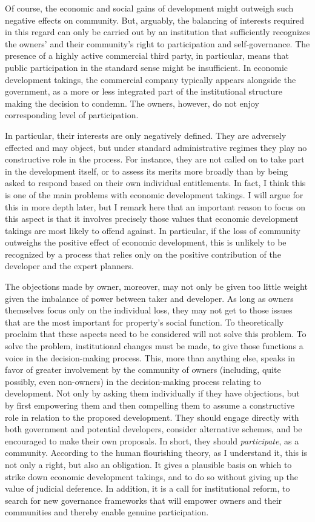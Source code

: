 Of course, the economic and social gains of development might outweigh such negative effects on community. But, arguably, the balancing of interests required in this regard can only be carried out by an institution that sufficiently recognizes the owners' and their community's right to participation and self-governance. The presence of a highly active commercial third party, in particular, means that public participation in the standard sense might be insufficient. In economic development takings, the commercial company typically appears alongside the government, as a more or less integrated part of the institutional structure making the decision to condemn. The owners, however, do not enjoy corresponding level of participation.

In particular, their interests are only negatively defined. They are adversely effected and may object, but under standard administrative regimes they play no constructive role in the process. For instance, they are not called on to take part in the development itself, or to assess its merits more broadly than by being asked to respond based on their own individual entitlements. In fact, I think this is one of the main problems with economic development takings. I will argue for this in more depth later, but I remark here that an important reason to focus on this aspect is that it involves precisely those values that economic development takings are most likely to offend against. In particular, if the loss of community outweighs the positive effect of economic development, this is unlikely to be recognized by a process that relies only on the positive contribution of the developer and the expert planners. 

The objections made by owner, moreover, may not only be given too little weight given the imbalance of power between taker and developer. As long as owners themselves focus only on the individual loss, they may not get to those issues that are the most important for property's social function. To theoretically proclaim that these aspects need to be considered will not solve this problem. To solve the problem, institutional changes must be made, to give those functions a voice in the decision-making process.
This, more than anything else, speaks in favor of greater involvement by the community of owners (including, quite possibly, even non-owners) in the decision-making process relating to development. Not only by asking them individually if they have objections, but by first empowering them and then compelling them to assume a constructive role in relation to the proposed development. They should engage directly with both government and potential developers, consider alternative schemes, and be encouraged to make their own proposals. In short, they should {\it participate}, as a community. According to the human flourishing theory, as I understand it, this is not only a right, but also an obligation. It gives a plausible basis on which to strike down economic development takings, and to do so without giving up the value of judicial deference. In addition, it is a call for institutional reform, to search for new governance frameworks that will empower owners and their communities and thereby enable genuine participation. 

